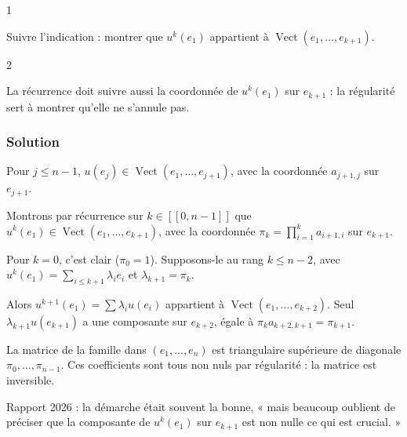 \documentclass[11pt,a4paper]{article}
\newcommand{\equationajustee}[1]{%
  \sbox{\boiteequation}{$\displaystyle #1$}%
  \ifdim\wd\boiteequation>\linewidth
    \[\resizebox{\linewidth}{!}{\usebox{\boiteequation}}\]%
  \else
    \[#1\]%
  \fi}
\begin{document}
\begin{indication}{1}

Suivre l'indication : montrer que \(u^k(e_1)\) appartient à \(\operatorname{Vect}(e_1,\dots,e_{k+1})\).

\end{indication}

\begin{indication}{2}

La récurrence doit suivre aussi la coordonnée de \(u^k(e_1)\) sur \(e_{k+1}\) : la régularité sert à montrer qu'elle ne s'annule pas.

\end{indication}

\hypertarget{solution-16}{%
\subsubsection{Solution}\label{solution-16}}

Pour \(j\leqslant n-1\), \(u(e_j)\in\operatorname{Vect}(e_1,\dots,e_{j+1})\), avec la coordonnée \(a_{j+1,j}\) sur \(e_{j+1}\).

Montrons par récurrence sur \(k\in[\![0,n-1]\!]\) que \(u^k(e_1)\in\operatorname{Vect}(e_1,\dots,e_{k+1})\), avec la coordonnée \(\pi_k=\prod_{i=1}^ka_{i+1,i}\) sur \(e_{k+1}\).

Pour \(k=0\), c'est clair (\(\pi_0=1\)). Supposons-le au rang \(k\leqslant n-2\), avec \(u^k(e_1)=\sum_{i\leqslant k+1}\lambda_ie_i\) et \(\lambda_{k+1}=\pi_k\).

Alors \(u^{k+1}(e_1)=\sum\lambda_iu(e_i)\) appartient à \(\operatorname{Vect}(e_1,\dots,e_{k+2})\). Seul \(\lambda_{k+1}u(e_{k+1})\) a une composante sur \(e_{k+2}\), égale à \(\pi_ka_{k+2,k+1}=\pi_{k+1}\).

La matrice de la famille dans \((e_1,\dots,e_n)\) est triangulaire supérieure de diagonale \(\pi_0,\dots,\pi_{n-1}\). Ces coefficients sont tous non nuls par régularité : la matrice est inversible.

\equationajustee{\boxed{(u^k(e_1))_{0\leqslant k\leqslant n-1}\text{ est une base de }E.}}

\begin{jury}

Rapport 2026 : la démarche était souvent la bonne, « mais beaucoup oublient de préciser que la composante de \(u^k(e_1)\) sur \(e_{k+1}\) est non nulle ce qui est crucial. »

\end{jury}
\end{document}
